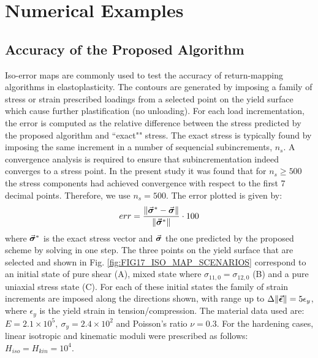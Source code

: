 \section{Numerical Examples}\label{section:CH3-S5}

\subsection{Accuracy of the Proposed Algorithm}    %

Iso-error maps are commonly used to test the accuracy of return-mapping 
algorithms in elastoplasticity\cite{DeSouza2011}. The contours are generated by 
imposing a family of stress or strain prescribed loadings from a selected point 
on the yield surface which cause further plastification (no unloading). For 
each load incrementation, the error is computed as the relative difference 
between the stress predicted by the proposed algorithm and ``exact"" stress. 
The exact stress is typically found by imposing the same increment in a number 
of sequencial subincrements, $n_s$. A convergence analysis is required to 
ensure that subincrementation indeed converges to a stress point. In the 
present study it was found that for $n_s\geq 500$ the stress components had 
achieved convergence with respect to the first 7 decimal points. Therefore, we 
use $n_s = 500$. The error plotted is given by:
\begin{equation}
	err = \frac{\Vert 
		\vec{\bm{\sigma}}^*-\vec{\bm{\sigma}}\Vert}{\Vert\vec{\bm{\sigma}}^*\Vert}\cdot 100
	\label{eq:ERROR}
\end{equation}
\noindent where $\vec{\bm{\sigma}}^*$ is the exact stress vector and 
$\vec{\bm{\sigma}}$ the one predicted by the proposed scheme by solving in one 
step. The three points on the yield surface that are selected and shown
in Fig. \ref{fig:FIG17_ISO_MAP_SCENARIOS} correspond to an initial state of 
pure shear (A), mixed 
state where $\sigma_{11,0}=\sigma_{12,0}$ (B) and a pure uniaxial stress state 
(C). 
For each of these initial states the family of strain increments are imposed 
along the directions shown, with range up to 
$\Delta\Vert\vec{\bm{\epsilon}}\Vert=5\epsilon_y$, where $\epsilon_y$ is the yield 
strain in tension/compression. The material data used are: $E=2.1\times 10^5,\ 
\sigma_y = 2.4\times 10^2$ and Poisson's ratio $\nu=0.3$. For the hardening 
cases, linear isotropic and 
kinematic moduli were prescribed as follows: $H_{iso}=H_{kin} = 10^4$.


